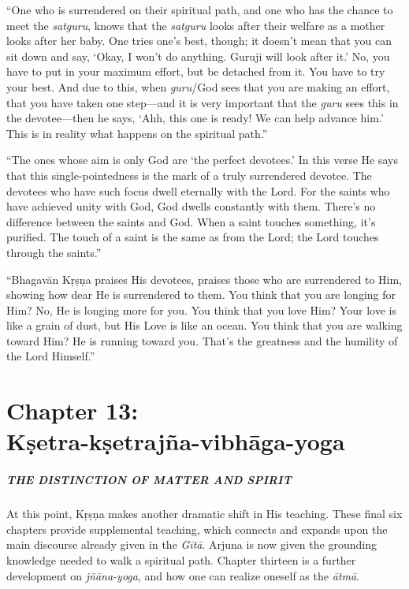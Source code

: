 \documentclass[12pt, twoside, openright]{memoir}
\begin{document}
\enquote{One who is surrendered on their spiritual path, and one who has the chance to meet the \textit{satguru}, knows that the \textit{satguru} looks after their welfare as a mother looks after her baby. One tries one’s best, though; it doesn’t mean that you can sit down and say, \enquote{Okay, I won’t do anything. Guruji will look after it.} No, you have to put in your maximum effort, but be detached from it. You have to try your best. And due to this, when \textit{guru}/God sees that you are making an effort, that you have taken one step---and it is very important that the \textit{guru} sees this in the devotee---then he says, \enquote{Ahh, this one is ready! We can help advance him.} This is in reality what happens on the spiritual path.}

\enquote{The ones whose aim is only God are \enquote{the perfect devotees.} In this verse He says that this single-pointedness is the mark of a truly surrendered devotee. The devotees who have such focus dwell eternally with the Lord. For the saints who have achieved unity with God, God dwells constantly with them. There’s no difference between the saints and God. When a saint touches something, it’s purified. The touch of a saint is the same as from the Lord; the Lord touches through the saints.}

\enquote{Bhagavān Kṛṣṇa praises His devotees, praises those who are surrendered to Him, showing how dear He is surrendered to them. You think that you are longing for Him? No, He is longing more for you. You think that you love Him? Your love is like a grain of dust, but His Love is like an ocean. You think that you are walking toward Him? He is running toward you. That’s the greatness and the humility of the Lord Himself.} \chapter{Chapter 13: \\Kṣetra-kṣetrajña-vibhāga-yoga}\label{chap-ksetra-ksetrajna-vibhaga-yoga}

\paragraph*{\MakeUppercase{The Distinction of Matter and Spirit}}


\noindent At this point, Kṛṣṇa makes another dramatic shift in His teaching. These final six chapters provide supplemental teaching, which connects and expands upon the main discourse already given in the \textit{Gītā}. Arjuna is now given the grounding knowledge needed to walk a spiritual path. Chapter thirteen is a further development on \textit{jñāna-yoga}, and how one can realize oneself as the \textit{ātmā}.
\end{document}
